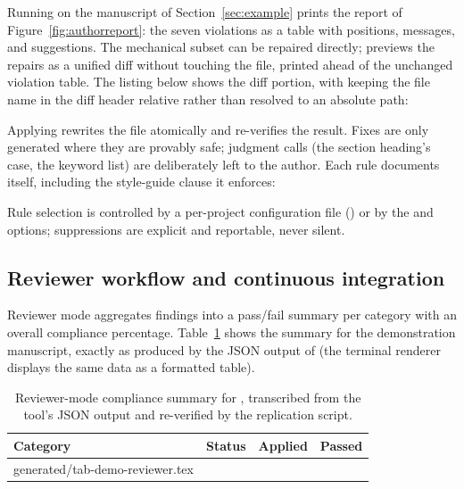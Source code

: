 \documentclass[nojss,article]{jss}
\makeatletter
\newcommand{\rawinput}[1]{\@@input #1 }
\makeatother
\begin{document}
Running  on the manuscript of
Section~\ref{sec:example} prints the report of
Figure~\ref{fig:authorreport}: the seven violations as a table with
positions, messages, and suggestions. The mechanical subset can be
repaired directly;  previews the repairs as a
unified diff without touching the file, printed ahead of the
unchanged violation table. The listing below shows the diff portion,
with  keeping the file name in the diff header
relative rather than resolved to an absolute path:


Applying  rewrites the file atomically and re-verifies
the result. Fixes are only generated where they are provably safe;
judgment calls (the section heading's case, the keyword list) are
deliberately left to the author. Each rule documents itself,
including the style-guide clause it enforces:


Rule selection is controlled by a per-project configuration file
() or by the  and
 options; suppressions are explicit and
reportable, never silent.

\subsection{Reviewer workflow and continuous integration}
\label{sec:reviewermode}

Reviewer mode aggregates findings into a pass/fail summary per
category with an overall compliance percentage.
Table~\ref{tab:reviewer} shows the summary for the demonstration
manuscript, exactly as produced by the JSON output of
 (the terminal renderer displays the same data
as a formatted table).

\begin{table}[t!]
\centering
\begin{tabular}{lrrr}
\toprule
Category & Status & Applied & Passed \\
\midrule
\rawinput{generated/tab-demo-reviewer.tex}
\end{tabular}
\caption{Reviewer-mode compliance summary for
  , transcribed from the tool's JSON output
  and re-verified by the replication script.}
\label{tab:reviewer}
\end{table}
\end{document}
